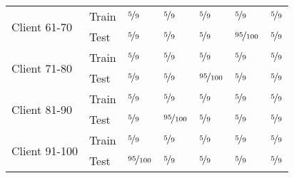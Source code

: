 \begin{tabular}{lllllll}
\cline{1-7}
\multirow{2}{*}{Client 61-70} & Train & $\nicefrac{{5}}{{9}}$ & $\nicefrac{{5}}{{9}}$ & $\nicefrac{{5}}{{9}}$ & $\nicefrac{{5}}{{9}}$ & $\nicefrac{{5}}{{9}}$ \\
              & Test & $\nicefrac{{5}}{{9}}$ & $\nicefrac{{5}}{{9}}$ & $\nicefrac{{5}}{{9}}$ & $\nicefrac{{95}}{{100}}$ & $\nicefrac{{5}}{{9}}$ \\
\cline{1-7}
\multirow{2}{*}{Client 71-80} & Train & $\nicefrac{{5}}{{9}}$ & $\nicefrac{{5}}{{9}}$ & $\nicefrac{{5}}{{9}}$ & $\nicefrac{{5}}{{9}}$ & $\nicefrac{{5}}{{9}}$ \\
              & Test & $\nicefrac{{5}}{{9}}$ & $\nicefrac{{5}}{{9}}$ & $\nicefrac{{95}}{{100}}$ & $\nicefrac{{5}}{{9}}$ & $\nicefrac{{5}}{{9}}$ \\
\cline{1-7}
\multirow{2}{*}{Client 81-90} & Train & $\nicefrac{{5}}{{9}}$ & $\nicefrac{{5}}{{9}}$ & $\nicefrac{{5}}{{9}}$ & $\nicefrac{{5}}{{9}}$ & $\nicefrac{{5}}{{9}}$ \\
              & Test & $\nicefrac{{5}}{{9}}$ & $\nicefrac{{95}}{{100}}$ & $\nicefrac{{5}}{{9}}$ & $\nicefrac{{5}}{{9}}$ & $\nicefrac{{5}}{{9}}$ \\
\cline{1-7}
\multirow{2}{*}{Client 91-100} & Train & $\nicefrac{{5}}{{9}}$ & $\nicefrac{{5}}{{9}}$ & $\nicefrac{{5}}{{9}}$ & $\nicefrac{{5}}{{9}}$ & $\nicefrac{{5}}{{9}}$ \\
              & Test & $\nicefrac{{95}}{{100}}$ & $\nicefrac{{5}}{{9}}$ & $\nicefrac{{5}}{{9}}$ & $\nicefrac{{5}}{{9}}$ & $\nicefrac{{5}}{{9}}$ \\
\bottomrule
\end{tabular}
